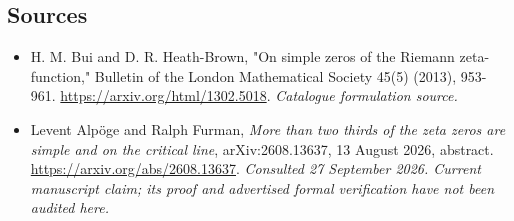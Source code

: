 \documentclass[11pt,a4paper]{article}
\numberwithin{equation}{section}
\begin{document}
\subsection{Sources}
\begin{itemize}\raggedright
\item[\textnormal{[S1]}]\hypertarget{source:30006766:1}{} H. M. Bui and D. R. Heath-Brown, "On simple zeros of the Riemann zeta-function," Bulletin of the London Mathematical Society 45(5) (2013), 953-961.
\url{https://arxiv.org/html/1302.5018}.
{\small\textit{Catalogue formulation source.}}
\item[\textnormal{[E1]}]\hypertarget{extra:30006766:1}{} Levent Alp\"oge and
Ralph Furman, \emph{More than two thirds of the zeta zeros are simple and on
the critical line}, arXiv:2608.13637, 13 August 2026, abstract.
\url{https://arxiv.org/abs/2608.13637}.
{\small\textit{Consulted 27 September 2026. Current manuscript claim;
its proof and advertised formal verification have not been audited here.}}
\end{itemize}
\end{document}
